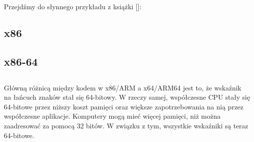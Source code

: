 \mysection{\HelloWorldSectionName}
\label{sec:helloworld}

Przejdźmy do słynnego przykładu z książki [\KRBook]:



\subsection{x86}





\subsection{x86-64}







\subsection{\Conclusion{}}

Główną różnicą między kodem w x86/ARM a x64/ARM64 jest to, że wskaźnik na łańcuch znaków stał się 64-bitowy.
W rzeczy samej, współczesne \ac{CPU} stały się 64-bitowe przez niższy koszt pamięci oraz większe zapotrzebowania na nią przez współczesne aplikacje.
Komputery mogą mieć więcej pamięci, niż można zaadresować za pomocą 32 bitów.
W związku z tym, wszystkie wskaźniki są teraz 64-bitowe.




